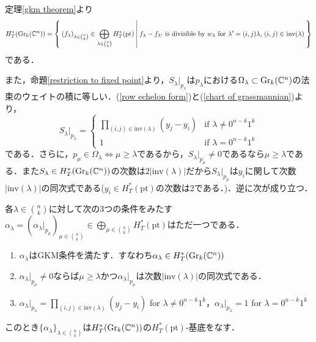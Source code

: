 定理\ref{gkm theorem}より
\[
H^*_T(\text{Gr}_k(\mathbb{C}^n))=\left\{\:(f_\lambda)_{\lambda\in\binom{n}{k}}\in\bigoplus_{\lambda\in\binom{n}{k}}H^*_T(\text{pt})\:\middle|\:f_\lambda-f_{\lambda'}\text{ is divisible by $w_\lambda$ for $\lambda' = (i,j)\lambda$, $(i,j)\in$ inv$(\lambda)$}\:\right\}
\]
である．

また，命題\ref{restriction to fixed point}より，$S_\lambda|_{p_\lambda}$は$p_\lambda$における$\Omega_\lambda\subset\text{Gr}_k(\mathbb{C}^n)$の法束のウェイトの積に等しい．(\ref{row echelon form})と(\ref{chart of grassmannian})より，
\begin{equation}\label{restriction of schubert class}
S_\lambda|_{p_\lambda} =\left\{\begin{array}{cc}
  \prod_{(i,j)\in\text{inv}(\lambda)}(y_j-y_i) & \text{if } \lambda\neq 0^{n-k}1^k\\
  1 & \text{if }\lambda = 0^{n-k}1^k
\end{array}\right. 
\end{equation}
である．さらに，$p_\mu\in\Omega_\lambda\Leftrightarrow\mu\geq\lambda$であるから，$S_\lambda|_{p_\mu}\neq0$であるなら$\mu\geq\lambda$である．また$S_\lambda\in H^*_T(\text{Gr}_k(\mathbb{C}^n))$の次数は$2|\text{inv}(\lambda)|$だから$S_\lambda|_{p_\mu}$は$y_i$に関して次数$|\text{inv}(\lambda)|$の同次式である($y_i\in H^*_T(\text{pt})$の次数は$2$である．)．逆に次が成り立つ．

\begin{prop}
  各$\lambda\in\binom{n}{k}$に対して次の3つの条件をみたす$\alpha_\lambda=(\alpha_\lambda|_{p_\mu})_{\mu\in\binom{n}{k}}\in\bigoplus_{\mu\in\binom{n}{k}}H^*_T(\text{pt})$はただ一つである．
  \begin{enumerate}
    \item $\alpha_\lambda$はGKM条件を満たす．すなわち$\alpha_\lambda\in H^*_T(\text{Gr}_k(\mathbb{C}^n))$
    \item $\alpha_\lambda|_{p_\mu}\neq0$ならば$\mu\geq\lambda$かつ$\alpha_\lambda|_{p_\mu}$は次数$|\text{inv}(\lambda)|$の同次式である．
    \item $\alpha_\lambda|_{p_\lambda} = \prod_{(i,j)\in\text{inv}(\lambda)}(y_j-y_i)$ for $\lambda\neq 0^{n-k}1^k$，$\alpha_{\lambda}|_{p_\lambda} = 1$ for $\lambda = 0^{n-k}1^k$
  \end{enumerate}
  このとき$\{\alpha_\lambda\}_{\lambda\in\binom{n}{k}}$は$H^*_T(\text{Gr}_k(\mathbb{C}^n))$の$H^*_T(\text{pt})$-基底をなす．
\end{prop}

